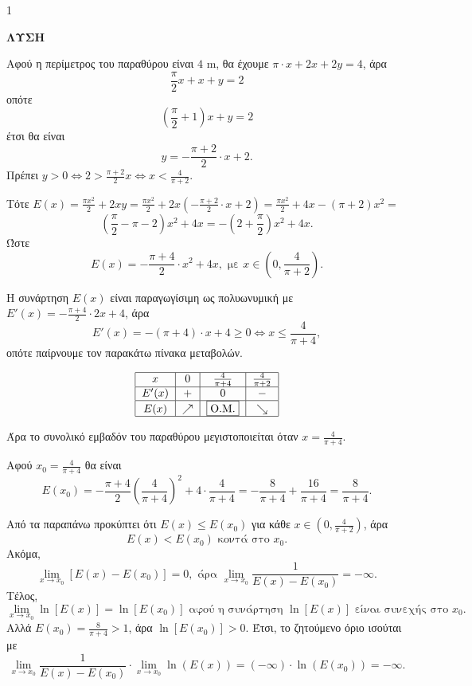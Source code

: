 \begin{ylh}{1}
    \item [Μαθηματική Ανάλυση, Μεγιστοποίηση Συνάρτησης, Όρια]
\end{ylh}
\textbf{ΛΥΣΗ}

\begin{alist}
\item Αφού η περίμετρος του παραθύρου είναι $4 \text{ m}$, θα έχουμε $\pi \cdot x + 2x + 2y = 4$, άρα
\[
\frac{\pi}{2}x + x + y = 2
\]
οπότε
\[
\left(\frac{\pi}{2} + 1\right)x + y = 2
\]
έτσι θα είναι
\[
y = -\frac{\pi+2}{2} \cdot x + 2.
\]
Πρέπει $y > 0 \Leftrightarrow 2 > \frac{\pi+2}{2}x \Leftrightarrow x < \frac{4}{\pi+2}$.

Τότε $E(x) = \frac{\pi x^2}{2} + 2xy = \frac{\pi x^2}{2} + 2x \left(-\frac{\pi+2}{2} \cdot x + 2\right) = \frac{\pi x^2}{2} + 4x - (\pi+2)x^2 = $
\[
\left(\frac{\pi}{2} - \pi - 2\right)x^2 + 4x = -\left(2 + \frac{\pi}{2}\right)x^2 + 4x.
\]
Ώστε
\[
E(x) = -\frac{\pi+4}{2} \cdot x^2 + 4x, \text{ με } x \in \left(0, \frac{4}{\pi+2}\right).
\]

\item Η συνάρτηση $E(x)$ είναι παραγωγίσιμη ως πολυωνυμική με $E'(x) = -\frac{\pi+4}{2} \cdot 2x + 4$, άρα
\[
E'(x) = -(\pi+4) \cdot x + 4 \geq 0 \Leftrightarrow x \leq \frac{4}{\pi+4},
\]
οπότε παίρνουμε τον παρακάτω πίνακα μεταβολών.

\[
\begin{tabular}{|c|c|c|c|}
\hline
$x$ & $0$ & $\frac{4}{\pi+4}$ & $\frac{4}{\pi+2}$ \\
\hline
$E'(x)$ & $+$ & $0$ & $-$ \\
\hline
$E(x)$ & $\nearrow$ & \boxed{\text{O.M.}} & $\searrow$ \\
\hline
\end{tabular}
\]

Άρα το συνολικό εμβαδόν του παραθύρου μεγιστοποιείται όταν $x = \frac{4}{\pi+4}$.

Αφού $x_0 = \frac{4}{\pi+4}$ θα είναι
\[
E(x_0) = -\frac{\pi+4}{2}\left(\frac{4}{\pi+4}\right)^2 + 4 \cdot \frac{4}{\pi+4} = -\frac{8}{\pi+4} + \frac{16}{\pi+4} = \frac{8}{\pi+4}.
\]

\item Από τα παραπάνω προκύπτει ότι $E(x) \leq E(x_0)$ για κάθε $x \in \left(0, \frac{4}{\pi+2}\right)$, άρα
\[
E(x) < E(x_0) \text{ κοντά στο } x_0.
\]
Ακόμα,
\[
\lim_{x \to x_0} [E(x) - E(x_0)] = 0, \text{ άρα } \lim_{x \to x_0} \frac{1}{E(x)-E(x_0)} = -\infty.
\]
Τέλος,
\[
\lim_{x \to x_0} \ln[E(x)] = \ln[E(x_0)] \text{ αφού η συνάρτηση } \ln[E(x)] \text{ είναι συνεχής στο } x_0.
\]
Αλλά $E(x_0) = \frac{8}{\pi+4} > 1$, άρα $\ln[E(x_0)] > 0$.
Έτσι, το ζητούμενο όριο ισούται με
\[
\lim_{x \to x_0} \frac{1}{E(x)-E(x_0)} \cdot \lim_{x \to x_0} \ln(E(x)) = (-\infty) \cdot \ln(E(x_0)) = -\infty.
\]
\end{alist}